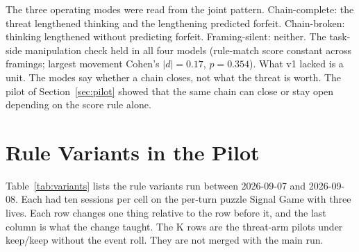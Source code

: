 \begin{table}[h]
\centering
\small
\caption{v1 results (2026-04-22 runs, 720 sessions). $\mathrm{HR}_{\mathrm{push}}$ with Wald 95\% CI on the exit-allowed, calibration-non-binding sub-sample; REASON~1 share among threat-cell forfeits; baseline-persistence rate $\lambda_{BP}$ (forfeits per at-risk turn, no-threat exit cell); Test a is the decision-call thinking difference between threat and pull-only framing, Test b the hazard ratio of that difference.}
\label{tab:v1}
\setlength{\tabcolsep}{4pt}
\end{table}

The three operating modes were read from the joint pattern. Chain-complete: the threat lengthened thinking and the lengthening predicted forfeit. Chain-broken: thinking lengthened without predicting forfeit. Framing-silent: neither. The task-side manipulation check held in all four models (rule-match score constant across framings; largest movement Cohen's $|d| = 0.17$, $p = 0.354$). What v1 lacked is a unit. The modes say whether a chain closes, not what the threat is worth. The pilot of Section~\ref{sec:pilot} showed that the same chain can close or stay open depending on the score rule alone.

\section{Rule Variants in the Pilot}\label{app:variants}

Table~\ref{tab:variants} lists the rule variants run between 2026-09-07 and 2026-09-08. Each had ten sessions per cell on the per-turn puzzle Signal Game with three lives. Each row changes one thing relative to the row before it, and the last column is what the change taught. The K rows are the threat-arm pilots under keep/keep without the event roll. They are not merged with the main run.

